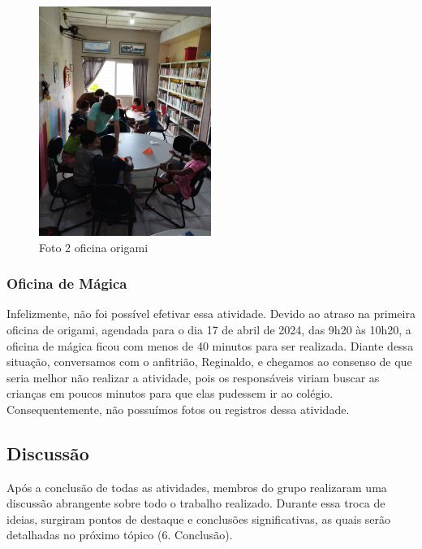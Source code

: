 \documentclass[a4paper,12pt]{article}
\begin{document}
\vspace{1cm}

\begin{figure}[h]
    \centering
    \includegraphics[width=0.5\textwidth]{imagem7.png}
    \caption{Foto 2 oficina origami}
    \label{fig:foto1505}
\end{figure}

\newpage

\subsubsection{Oficina de Mágica}
Infelizmente, não foi possível efetivar essa atividade. Devido ao atraso na primeira oficina de origami, agendada para o dia 17 de abril de 2024, das 9h20 às 10h20, a oficina de mágica ficou com menos de 40 minutos para ser realizada. Diante dessa situação, conversamos com o anfitrião, Reginaldo, e chegamos ao consenso de que seria melhor não realizar a atividade, pois os responsáveis viriam buscar as crianças em poucos minutos para que elas pudessem ir ao colégio. Consequentemente, não possuímos fotos ou registros dessa atividade.

\vspace{0.5cm}
\subsection{\Large{Discussão}}
Após a conclusão de todas as atividades, membros do grupo realizaram uma discussão abrangente sobre todo o trabalho realizado. Durante essa troca de ideias, surgiram pontos de destaque e conclusões significativas, as quais serão detalhadas no próximo tópico (6. Conclusão).

\newpage{}
\end{document}
